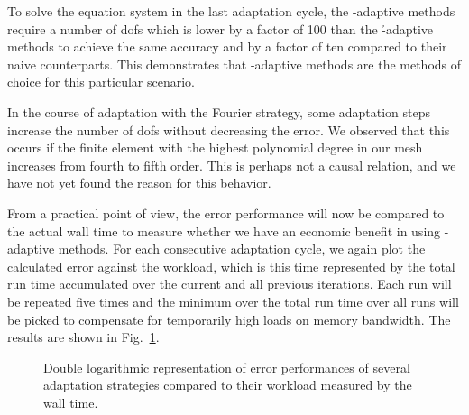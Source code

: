 To solve the equation system in the last adaptation cycle, the \hp-adaptive methods %
require a number of \glspl{dof} which is lower by a factor of 100 than the \h-adaptive methods to achieve the same accuracy
and by a factor of ten compared to their naive counterparts. This demonstrates that \hp-adaptive methods are the methods of choice for this particular scenario.


In the course of adaptation with the Fourier strategy, some adaptation steps increase the number of \glspl{dof} without decreasing the error.
We observed that this occurs if the finite element with the highest polynomial degree in our mesh increases from fourth to fifth order. This is perhaps not a causal relation, and we have not yet found the reason for this behavior.





From a practical point of view, the error performance will now be compared to the actual wall time to measure whether we have an economic benefit in using \hp-adaptive methods. For each consecutive adaptation cycle, we again plot the calculated error against the workload, which is this time represented by the total run time accumulated over the current and all previous iterations. Each run will be repeated five times and the minimum over the total run time over all runs will be picked to compensate for temporarily high loads on memory bandwidth. The results are shown in Fig.~\ref{fig:errorwalltime}.

\begin{figure}
\centering

\caption[Error performances of several adaptation strategies compared to their workload measured by the wall time.]{Double logarithmic representation of error performances of several adaptation strategies compared to their workload measured by the wall time.}
\label{fig:errorwalltime}
\end{figure}

